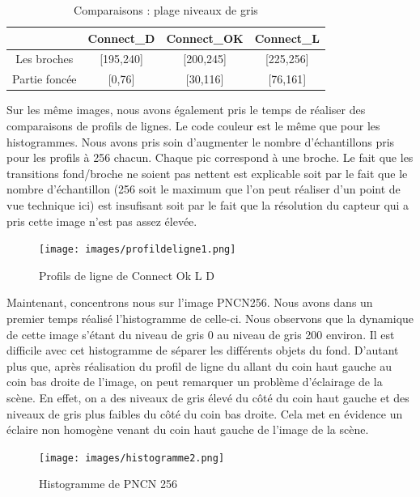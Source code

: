 \documentclass{scrreprt}
\begin{document}
\begin{table}[!h]
	\begin{center}
		\begin{tabular}{|c|c|c|c|}
		   \hline
		   & Connect_D & Connect_OK & Connect_L \\
		   \hline
		   Les broches & [195,240]& [200,245] & [225,256]\\
		   \hline
		   Partie foncée & [0,76] & [30,116] & [76,161]\\
		   \hline
		\end{tabular}
	\end{center}
	\caption{Comparaisons : plage niveaux de gris}
\end{table}

\newpage
Sur les même images, nous avons également pris le temps de réaliser des comparaisons de profils de lignes. Le code couleur est le même
que pour les histogrammes. Nous avons pris soin d'augmenter le nombre d'échantillons pris pour les profils à 256 chacun. Chaque pic 
correspond à une broche. Le fait que les transitions fond/broche ne soient pas nettent est explicable soit par le fait que le nombre
d'échantillon (256 soit le maximum que l'on peut réaliser d'un point de vue technique ici) est insufisant soit par le fait que la résolution
du capteur qui a pris cette image n'est pas assez élevée.

\begin{figure}[!h]
\centering
\texttt{[image: images/profildeligne1.png]}
\caption{Profils de ligne de Connect Ok L D}
\end{figure}

\newpage
Maintenant, concentrons nous sur l'image PNCN256. Nous avons dans un premier temps réalisé l'histogramme de celle-ci. Nous observons que 
la dynamique de cette image s'étant du niveau de gris 0 au niveau de gris 200 environ. Il est difficile avec cet histogramme de séparer
les différents objets du fond. D'autant plus que, après réalisation du profil de ligne du allant du coin haut gauche au coin bas droite de l'image, on peut remarquer un problème 
d'éclairage de la scène. En effet, on a des niveaux de gris élevé du côté du coin haut gauche et des niveaux de gris plus faibles du côté 
du coin bas droite. Cela met en évidence un éclaire non homogène venant du coin haut gauche de l'image de la scène. 
  

\begin{figure}[!h]
\centering
\texttt{[image: images/histogramme2.png]}
\caption{Histogramme de PNCN 256}
\end{figure}
\end{document}
